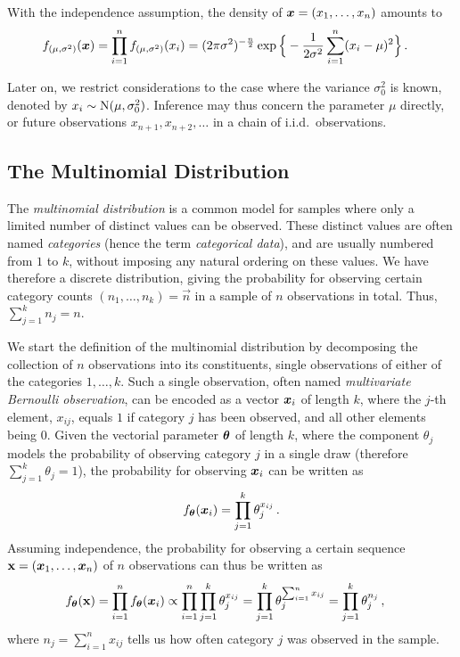 With the independence assumption, the density of ${\bm x} = (x_1,\ldots,x_n)$ amounts to
\begin{align}\label{eq:normaldens}
f_{(\mu, \sigma^2)}({\bm x})
 &= \prod_{i=1}^n f_{(\mu, \sigma^2)}(x_{i})
  = (2\pi\sigma^2)^{-\frac{n}{2}}\exp\Big\{ -\frac{1}{2\sigma^2}\sum_{i=1}^n (x_{i} - \mu)^2 \Big\}\,.
\end{align}

Later on, we restrict considerations to the case where the variance $\sigma_0^2$ is known, denoted by $x_i \sim \operatorname{N}(\mu, \sigma_0^2)$.
Inference may thus concern the parameter $\mu$ directly, or future observations $x_{n+1}, x_{n+2}, \ldots$ in a chain of i.i.d.\ observations.


\subsection{The Multinomial Distribution}
\label{sec:multinomdist}

The \emph{multinomial distribution} is a common model for samples where only a limited number of distinct values can be observed.
These distinct values are often named \emph{categories} (hence the term \emph{categorical data}),
and are usually numbered from $1$ to $k$, without imposing any natural ordering on these values.
We have therefore a discrete distribution,
giving the probability for observing certain category counts $(n_1, \ldots, n_k) = \vec{n}$ in a sample of $n$ observations in total.
Thus, $\sum_{j=1}^k n_j = n$.

We start the definition of the multinomial distribution by decomposing the collection of $n$ observations into its constituents,
single observations of either of the categories $1,\ldots,k$.
Such a single observation, often named \emph{multivariate Bernoulli observation}, can be encoded as a vector ${\bm x}_i$ of length $k$,
where the $j$-th element, $x_{ij}$, equals $1$ if category $j$ has been observed, and all other elements being $0$.
Given the vectorial parameter $\boldsymbol{\theta}$ of length $k$,
where the component $\theta_j$ models the probability of observing category $j$ in a single draw
(therefore $\sum_{j=1}^k \theta_j = 1$),
the probability for observing ${\bm x}_i$ can be written as
\begin{align*}
f_{\boldsymbol{\theta}}({\bm x}_i) = \prod_{j=1}^k \theta_j^{x_{ij}}\,.
\end{align*}
Assuming independence, the probability for observing a certain sequence
$\mathbf{x} = ({\bm x}_1, \ldots, {\bm x}_n)$ of $n$ observations can thus be written as
\begin{align*}
f_{\boldsymbol{\theta}}(\mathbf{x}) &= \prod_{i=1}^n f_{\boldsymbol{\theta}}({\bm x}_i)
                \propto \prod_{i=1}^n \prod_{j=1}^k \theta_j^{x_{ij}}
                      = \prod_{j=1}^k \theta_j^{\sum_{i=1}^n x_{ij}}
                      = \prod_{j=1}^k \theta_j^{n_j}\,,
\end{align*}
where $n_j = \sum_{i=1}^n x_{ij}$ tells us how often category $j$ was observed in the sample.

